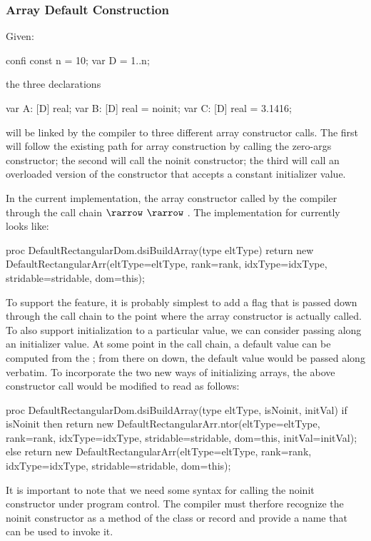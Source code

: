 \subsubsection{Array Default Construction}

Given:
\begin{chapel}
confi const n = 10;
var D = {1..n};
\end{chapel}
\noindent
the three declarations
\begin{chapel}
var A: [D] real;
var B: [D] real = noinit;
var C: [D] real = 3.1416;
\end{chapel}
\noindent
will be linked by the compiler to three different array constructor calls.  The first will
follow the existing path for array construction by calling the zero-args constructor; the
second will call the noinit constructor; the third will call an overloaded version of the
constructor that accepts a constant initializer value.

In the current implementation, the array constructor called by the compiler through the
call chain  $\rarrow$ 
$\rarrow$ .  The implementation for
 currently looks like:
\begin{chapel}
    proc DefaultRectangularDom.dsiBuildArray(type eltType) {
      return new DefaultRectangularArr(eltType=eltType, rank=rank, idxType=idxType,
                                      stridable=stridable, dom=this);
    }
\end{chapel}

To support the  feature, it is probably simplest to add a flag that is passed
down through the call chain to the point where the array constructor is actually called.
To also support initialization to a particular value, we can consider passing along an
initializer value.  At some point in the call chain, a default value can be computed from
the ; from there on down, the default value would be passed along verbatim.
To incorporate the two new ways of initializing arrays, the above constructor call would
be modified to read as follows:
\begin{chapel}
    proc DefaultRectangularDom.dsiBuildArray(type eltType, isNoinit, initVal) {
      if isNoinit then
        return new DefaultRectangularArr.ntor(eltType=eltType, rank=rank, idxType=idxType,
                                              stridable=stridable, dom=this, initVal=initVal);
      else
        return new DefaultRectangularArr(eltType=eltType, rank=rank, idxType=idxType,
                                         stridable=stridable, dom=this);
    }
\end{chapel}
It is important to note that we need some syntax for calling the noinit constructor under
program control.   The compiler must therfore recognize the noinit constructor 
as a method of the class or record and provide a name that can be used to invoke it.

